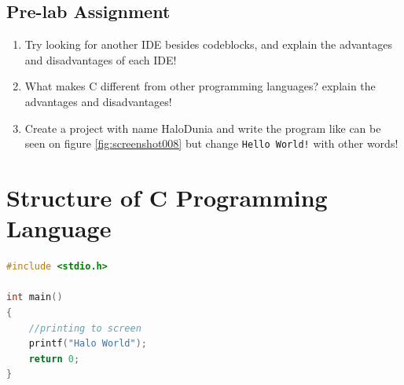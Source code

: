 \subsection{Pre-lab Assignment}
\begin{enumerate}
	\item Try looking for another IDE besides codeblocks, and explain the advantages and disadvantages of each IDE!
	\item What makes C different from other programming languages? explain the advantages and disadvantages!
	\item Create a project with name HaloDunia and write the program like can be seen on figure \ref{fig:screenshot008} but change \verb|Hello World!| with other words!
\end{enumerate}

%			
%			
%			
\section{Structure of C Programming Language}

\begin{lstlisting}[language=c,caption=Simple program example for C programming language,label=lst:helloworld,captionpos=t]
#include <stdio.h>

int main()
{
	//printing to screen
	printf("Halo World");
	return 0;
}
\end{lstlisting}

